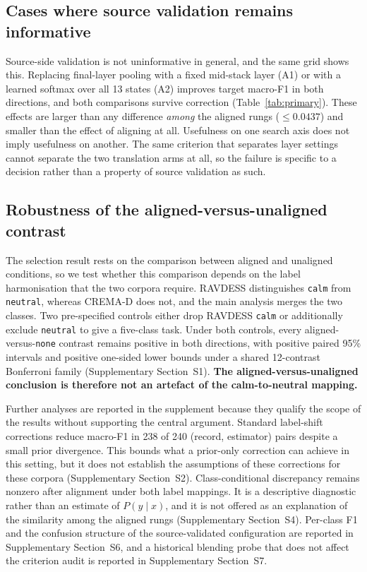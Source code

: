 \subsection{Cases where source validation remains informative}
\label{sec:results-aggregation}

Source-side validation is not uninformative in general, and the same grid
shows this. Replacing final-layer pooling with a fixed mid-stack layer (A1) or
with a learned softmax over all 13 states (A2) improves target macro-F1 in both
directions, and both comparisons survive correction (Table~\ref{tab:primary}).
These effects are larger than any difference \emph{among} the aligned rungs
($\le 0.0437$) and smaller than the effect of aligning at all. Usefulness on
one search axis does not imply usefulness on another. The same criterion that
separates layer settings cannot separate the two translation arms at all, so
the failure is specific to a decision rather than a property of source
validation as such.

\subsection{Robustness of the aligned-versus-unaligned contrast}
\label{sec:results-robustness}

The selection result rests on the comparison between aligned and unaligned
conditions, so we test whether this comparison depends on the label
harmonisation that the two corpora require. RAVDESS distinguishes
\texttt{calm} from \texttt{neutral}, whereas CREMA-D does not, and the main
analysis merges the two classes. Two pre-specified controls either drop RAVDESS
\texttt{calm} or additionally exclude \texttt{neutral} to give a five-class
task. Under both controls, every aligned-versus-\texttt{none} contrast remains
positive in both directions, with positive paired 95\% intervals and positive
one-sided lower bounds under a shared 12-contrast Bonferroni family
(Supplementary Section~S1). \textbf{The aligned-versus-unaligned conclusion is
therefore not an artefact of the calm-to-neutral mapping.}

Further analyses are reported in the supplement because they qualify the scope
of the results without supporting the central argument. Standard
label-shift corrections reduce macro-F1 in 238 of 240 (record, estimator)
pairs despite a small prior divergence. This bounds what a prior-only
correction can achieve in this setting, but it does not establish the
assumptions of these corrections for these corpora (Supplementary
Section~S2). Class-conditional discrepancy remains nonzero after alignment
under both label mappings. It is a descriptive diagnostic rather than an
estimate of $P(y \mid x)$, and it is not offered as an explanation of the
similarity among the aligned rungs (Supplementary Section~S4). Per-class F1 and
the confusion structure of the source-validated configuration are reported in
Supplementary Section~S6, and a historical blending probe that does not affect
the criterion audit is reported in Supplementary Section~S7.
